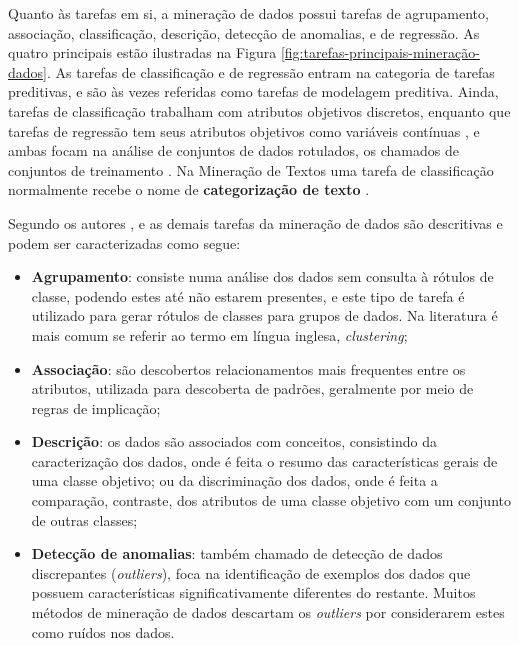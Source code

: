         Quanto às tarefas em si, a mineração de dados possui tarefas de agrupamento, associação, classificação, descrição, detecção de anomalias, e de regressão.
        As quatro principais estão ilustradas na Figura \ref{fig:tarefas-principais-mineração-dados}.
        As tarefas de classificação e de regressão entram na categoria de tarefas preditivas, e são às vezes referidas como tarefas de modelagem preditiva. 
        Ainda, tarefas de classificação trabalham com atributos objetivos discretos, enquanto que tarefas de regressão tem seus atributos objetivos como variáveis contínuas , e ambas focam na análise de conjuntos de dados rotulados, os chamados de conjuntos de treinamento \cite[p.~19]{Han:2011:DMC:1972541}.
        Na Mineração de Textos uma tarefa de classificação normalmente recebe o nome de \textbf{categorização de texto} \cite[p.~6]{TurchiATPUKM2009} \cite[p.~61]{Feldman:2006:TMH:1076381}.
        
        
        
        Segundo os autores ,  e  as demais tarefas da mineração de dados são descritivas e podem ser caracterizadas como segue:
        \begin{itemize}
            \item \textbf{Agrupamento}: consiste numa análise dos dados sem consulta à rótulos de classe, podendo estes até não estarem presentes, e este tipo de tarefa é utilizado para gerar rótulos de classes para grupos de dados. 
            Na literatura é mais comum se referir ao termo em língua inglesa, \textit{clustering};
            
            \item \textbf{Associação}: são descobertos relacionamentos mais frequentes entre os atributos, utilizada para descoberta de padrões, geralmente por meio de regras de implicação;
            
            \item \textbf{Descrição}: os dados são associados com conceitos, consistindo da caracterização dos dados, onde é feita o resumo das características gerais de uma classe objetivo; 
            ou da discriminação dos dados, onde é feita a comparação, contraste, dos atributos de uma classe objetivo com um conjunto de outras classes;
            
            \item \textbf{Detecção de anomalias}: também chamado de detecção de dados discrepantes (\textit{outliers}), foca na identificação de exemplos dos dados que possuem características significativamente diferentes do restante. 
            Muitos métodos de mineração de dados descartam os \textit{outliers} por considerarem estes como ruídos nos dados.
        \end{itemize}
    
